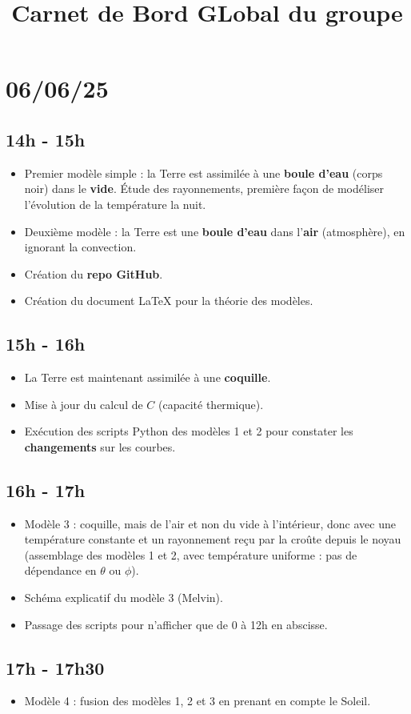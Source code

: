 \documentclass[a4paper,12pt]{article}
\title{Carnet de Bord GLobal du groupe}
\begin{document}
\maketitle
\section*{06/06/25}

\subsection*{14h - 15h}

\begin{itemize}
    \item Premier modèle simple : la Terre est assimilée à une \textbf{boule d'eau} (corps noir) dans le \textbf{vide}. Étude des rayonnements, première façon de modéliser l'évolution de la température la nuit.
    \item Deuxième modèle : la Terre est une \textbf{boule d'eau} dans l'\textbf{air} (atmosphère), en ignorant la convection.
    \item Création du \textbf{repo GitHub}.
    \item Création du document \LaTeX{} pour la théorie des modèles.
\end{itemize}

\subsection*{15h - 16h}

\begin{itemize}
    \item La Terre est maintenant assimilée à une \textbf{coquille}.
    \item Mise à jour du calcul de $C$ (capacité thermique).
    \item Exécution des scripts Python des modèles 1 et 2 pour constater les \textbf{changements} sur les courbes.
\end{itemize}

\subsection*{16h - 17h}

\begin{itemize}
    \item Modèle 3 : coquille, mais de l'air et non du vide à l'intérieur, donc avec une température constante et un rayonnement reçu par la croûte depuis le noyau (assemblage des modèles 1 et 2, avec température uniforme : pas de dépendance en $\theta$ ou $\phi$).
    \item Schéma explicatif du modèle 3 (Melvin).
    \item Passage des scripts pour n'afficher que de 0 à 12h en abscisse.
\end{itemize}

\subsection*{17h - 17h30}

\begin{itemize}
    \item Modèle 4 : fusion des modèles 1, 2 et 3 en prenant en compte le Soleil.
\end{itemize}
\end{document}
